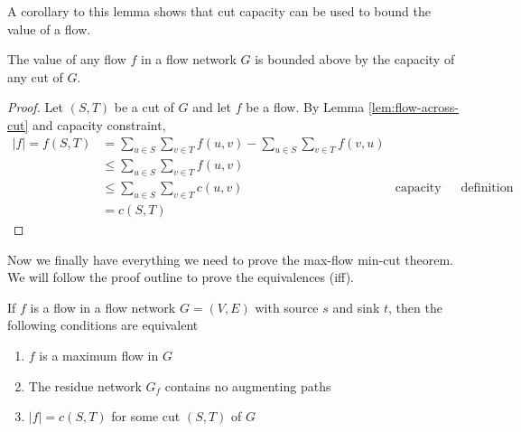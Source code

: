 A corollary to this lemma shows that cut capacity can be used to bound the value of a flow.

\begin{corollary} \label{corollary:flow-upper-bound}
    The value of any flow $f$ in a flow network $G$ is bounded above by the capacity of any cut of $G$.
\end{corollary}

\begin{proof}
    Let $(S,T)$ be a cut of $G$ and let $f$ be a flow. By Lemma \ref{lem:flow-across-cut} and capacity constraint,
    $$
    \begin{aligned}
        |f| = f(S,T) &= \sum_{u \in S}\sum_{v \in T}f(u,v) - \sum_{u \in S}\sum_{v \in T}f(v,u) \\
        &\leq \sum_{u \in S}\sum_{v \in T}f(u,v) \\
        &\leq \sum_{u \in S}\sum_{v \in T} c(u,v) & \text{capacity constraint} & \text{definition} \\
        &= c(S,T)
    \end{aligned}
    $$
\end{proof}

Now we finally have everything we need to prove the max-flow min-cut theorem. We will follow the proof outline to prove the equivalences (iff).

\begin{theorem} 
    If $f$ is a flow in a flow network $G=(V,E)$ with source $s$ and sink $t$, then the following conditions are equivalent
    \begin{enumerate}
        \item $f$ is a maximum flow in $G$ 
        \item The residue network $G_f$ contains no augmenting paths
        \item $|f| = c(S,T)$ for some cut $(S,T)$ of $G$ 
    \end{enumerate}
\end{theorem}

